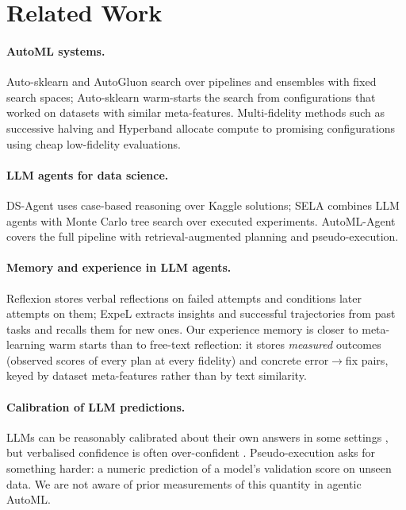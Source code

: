 \section{Related Work}
\label{sec:related}

\paragraph{AutoML systems.} Auto-sklearn \citep{feurer2015autosklearn} and AutoGluon \citep{erickson2020autogluon} search over pipelines and ensembles with fixed search spaces; Auto-sklearn warm-starts the search from configurations that worked on datasets with similar meta-features. Multi-fidelity methods such as successive halving and Hyperband \citep{jamieson2016successive,li2018hyperband} allocate compute to promising configurations using cheap low-fidelity evaluations.

\paragraph{LLM agents for data science.} DS-Agent \citep{guo2024dsagent} uses case-based reasoning over Kaggle solutions; SELA \citep{chi2024sela} combines LLM agents with Monte Carlo tree search over executed experiments. AutoML-Agent \citep{trirat2025automlagent} covers the full pipeline with retrieval-augmented planning and pseudo-execution.

\paragraph{Memory and experience in LLM agents.} Reflexion \citep{shinn2023reflexion} stores verbal reflections on failed attempts and conditions later attempts on them; ExpeL \citep{zhao2024expel} extracts insights and successful trajectories from past tasks and recalls them for new ones. Our experience memory is closer to meta-learning warm starts than to free-text reflection: it stores \emph{measured} outcomes (observed scores of every plan at every fidelity) and concrete error$\to$fix pairs, keyed by dataset meta-features rather than by text similarity.

\paragraph{Calibration of LLM predictions.} LLMs can be reasonably calibrated about their own answers in some settings \citep{kadavath2022know}, but verbalised confidence is often over-confident \citep{xiong2024uncertainty}. Pseudo-execution asks for something harder: a numeric prediction of a model's validation score on unseen data. We are not aware of prior measurements of this quantity in agentic AutoML.

